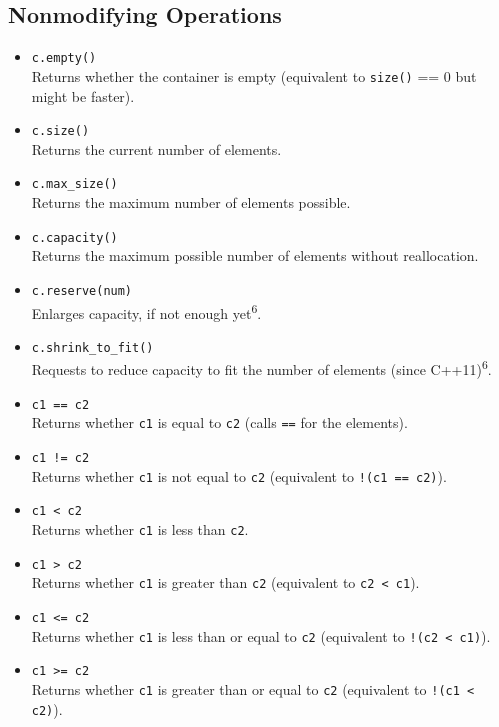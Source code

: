\documentclass{report}
\begin{document}
    \subsection{Nonmodifying Operations}
    \bigbreak \noindent 
\begin{itemize}
    \item \texttt{c.empty()} \\
          Returns whether the container is empty (equivalent to \texttt{size()} == 0 but might be faster).
          
    \item \texttt{c.size()} \\
          Returns the current number of elements.
          
    \item \texttt{c.max\_size()} \\
          Returns the maximum number of elements possible.
          
    \item \texttt{c.capacity()} \\
          Returns the maximum possible number of elements without reallocation.
          
    \item \texttt{c.reserve(num)} \\
          Enlarges capacity, if not enough yet\textsuperscript{6}.
          
    \item \texttt{c.shrink\_to\_fit()} \\
          Requests to reduce capacity to fit the number of elements (since C++11)\textsuperscript{6}.
          
    \item \texttt{c1 == c2} \\
          Returns whether \texttt{c1} is equal to \texttt{c2} (calls \texttt{==} for the elements).
          
    \item \texttt{c1 != c2} \\
          Returns whether \texttt{c1} is not equal to \texttt{c2} (equivalent to \texttt{!(c1 == c2)}).
          
    \item \texttt{c1 < c2} \\
          Returns whether \texttt{c1} is less than \texttt{c2}.
          
    \item \texttt{c1 > c2} \\
          Returns whether \texttt{c1} is greater than \texttt{c2} (equivalent to \texttt{c2 < c1}).
          
    \item \texttt{c1 <= c2} \\
          Returns whether \texttt{c1} is less than or equal to \texttt{c2} (equivalent to \texttt{!(c2 < c1)}).
          
    \item \texttt{c1 >= c2} \\
          Returns whether \texttt{c1} is greater than or equal to \texttt{c2} (equivalent to \texttt{!(c1 < c2)}).
\end{itemize}
\end{document}
